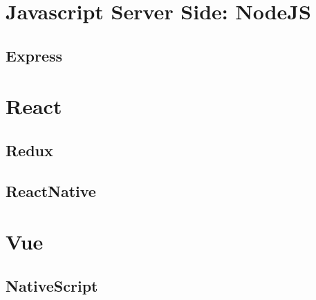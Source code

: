 \documentclass{apostila}
\begin{document}
\chapter{Javascript Server Side: NodeJS}
\section{Express}




\chapter{React}
\section{Redux}
\section{ReactNative}




\chapter{Vue}
\section{NativeScript}


\end{document}
